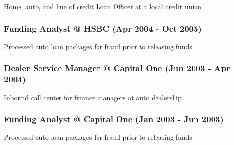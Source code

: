 Home, auto, and line of credit Loan Officer at a local credit union

\hypertarget{funding-analyst-hsbc-apr-2004---oct-2005}{%
\subsubsection{Funding Analyst @ HSBC (Apr 2004 - Oct
2005)}\label{funding-analyst-hsbc-apr-2004---oct-2005}}

Processed auto loan packages for fraud prior to releasing funds

\hypertarget{dealer-service-manager-capital-one-jun-2003---apr-2004}{%
\subsubsection{Dealer Service Manager @ Capital One (Jun 2003 - Apr
2004)}\label{dealer-service-manager-capital-one-jun-2003---apr-2004}}

Inbound call center for finance managers at auto dealership

\hypertarget{funding-analyst-capital-one-jan-2003---jun-2003}{%
\subsubsection{Funding Analyst @ Capital One (Jan 2003 - Jun
2003)}\label{funding-analyst-capital-one-jan-2003---jun-2003}}

Processed auto loan packages for fraud prior to releasing funds
